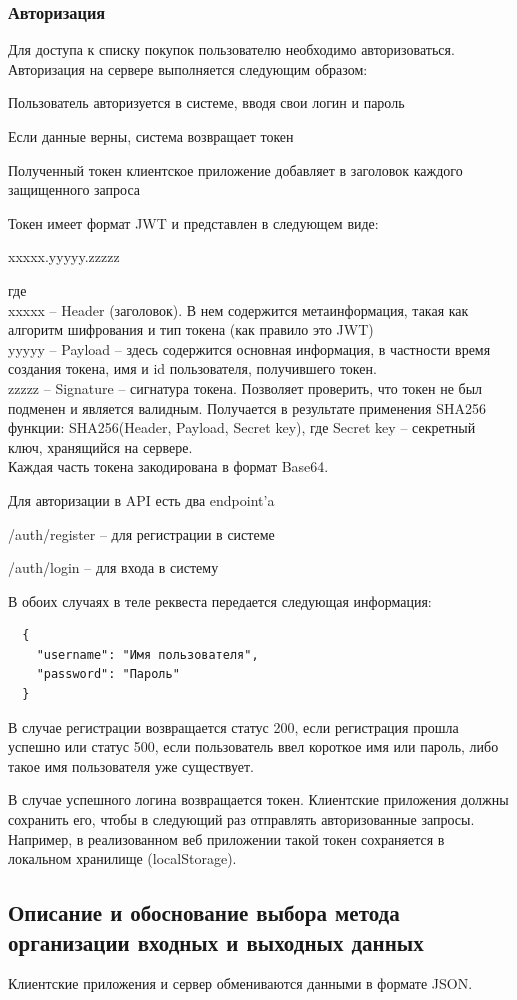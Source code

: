 \subsubsection{Авторизация}
Для доступа к списку покупок пользователю необходимо авторизоваться.
Авторизация на сервере выполняется следующим образом:
\begin{my_enumerate}
  \item Пользователь авторизуется в системе, вводя свои логин и пароль
  \item Если данные верны, система возвращает токен
  \item Полученный токен клиентское приложение добавляет в заголовок
    каждого защищенного запроса
\end{my_enumerate}

Токен имеет формат JWT и представлен в следующем виде:
\begin{center}
  xxxxx.yyyyy.zzzzz
\end{center}
где\\
xxxxx -- Header (заголовок). В нем содержится метаинформация, такая как алгоритм шифрования и тип токена (как правило это JWT)\\
yyyyy -- Payload -- здесь содержится основная информация, в частности время создания токена, имя и id пользователя, получившего токен.\\
zzzzz -- Signature -- сигнатура токена. Позволяет проверить, что токен не был
подменен и является валидным. Получается в результате применения SHA256 функции:
SHA256(Header, Payload, Secret key), где Secret key -- секретный ключ, хранящийся на сервере. \\
Каждая часть токена закодирована в формат Base64.

Для авторизации в API есть два endpoint'a
\begin{my_enumerate}
  \item /auth/register -- для регистрации в системе
  \item /auth/login -- для входа в систему
\end{my_enumerate}

В обоих случаях в теле реквеста передается следующая информация: 
\begin{verbatim}
  {
    "username": "Имя пользователя",
    "password": "Пароль"
  }
\end{verbatim}

В случае регистрации возвращается статус 200, если регистрация прошла успешно
или статус 500, если пользователь ввел короткое имя или пароль, либо такое
имя пользователя уже существует.

В случае успешного логина возвращается токен. Клиентские приложения должны
сохранить его, чтобы в следующий раз отправлять авторизованные запросы.
Например, в реализованном веб приложении такой токен сохраняется в локальном хранилище
(localStorage).

\subsection{Описание и обоснование выбора метода организации входных и выходных данных}
Клиентские приложения и сервер обмениваются данными в формате JSON.

